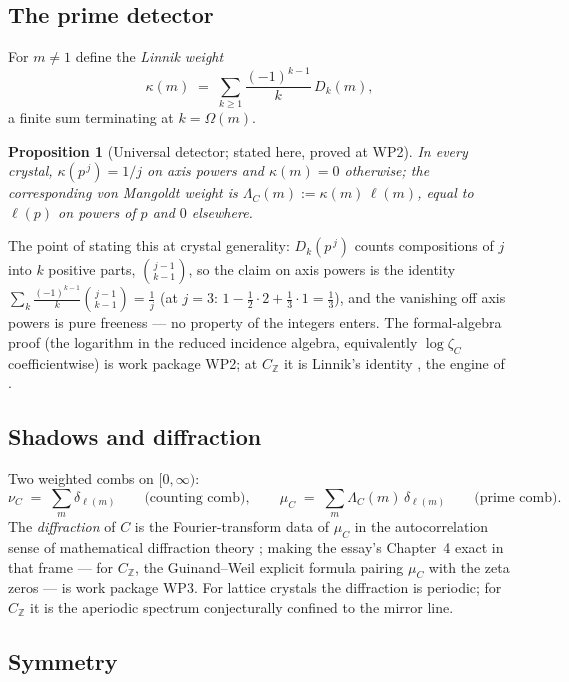 \documentclass[11pt]{article}
\newtheorem{proposition}{Proposition}
\theoremstyle{remark}
\newcommand{\Z}{\mathbb{Z}}
\begin{document}
\subsection{The prime detector}

For $m \ne 1$ define the \emph{Linnik weight}
\[
\kappa(m) \;=\; \sum_{k \ge 1} \frac{(-1)^{k-1}}{k}\, D_k(m),
\]
a finite sum terminating at $k = \Omega(m)$.

\begin{proposition}[Universal detector; stated here, proved at WP2]\label{prop:linnik}
In every crystal, $\kappa(p^{\,j}) = 1/j$ on axis powers and $\kappa(m) = 0$ otherwise; the
corresponding von Mangoldt weight is $\Lambda_C(m) := \kappa(m)\,\ell(m)$, equal to $\ell(p)$ on
powers of $p$ and $0$ elsewhere.
\end{proposition}

The point of stating this at crystal generality: $D_k(p^{\,j})$ counts compositions of $j$ into $k$
positive parts, $\binom{j-1}{k-1}$, so the claim on axis powers is the identity
$\sum_k \frac{(-1)^{k-1}}{k}\binom{j-1}{k-1} = \frac1j$ (at $j = 3$:
$1 - \tfrac12\cdot 2 + \tfrac13\cdot 1 = \tfrac13$), and the vanishing off axis powers is pure
freeness --- no property of the integers enters. The formal-algebra proof (the logarithm in the
reduced incidence algebra, equivalently $\log \zeta_C$ coefficientwise) is work package WP2; at
$C_{\Z}$ it is Linnik's identity \cite{Linnik}, the engine of \cite{CompanionI}.

\subsection{Shadows and diffraction}

Two weighted combs on $[0, \infty)$:
\[
\nu_C \;=\; \sum_{m} \delta_{\ell(m)} \qquad\text{(counting comb)}, \qquad
\mu_C \;=\; \sum_{m} \Lambda_C(m)\, \delta_{\ell(m)} \qquad\text{(prime comb)}.
\]
The \emph{diffraction} of $C$ is the Fourier-transform data of $\mu_C$ in the autocorrelation sense
of mathematical diffraction theory \cite{BaakeGrimm}; making the essay's Chapter~4 exact in that
frame --- for $C_{\Z}$, the Guinand--Weil explicit formula pairing $\mu_C$ with the zeta zeros ---
is work package WP3. For lattice crystals the diffraction is periodic; for $C_{\Z}$ it is the
aperiodic spectrum conjecturally confined to the mirror line.

\subsection{Symmetry}
\end{document}
